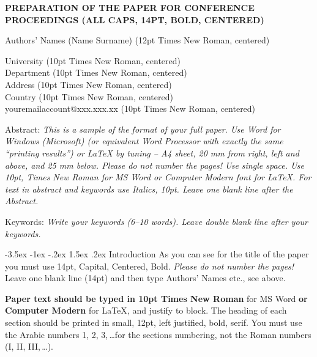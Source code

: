 \documentclass[a4paper,10pt]{article}
\makeatletter
\theoremstyle{definition}
\renewcommand\section{\@startsection {section}{1}{\z@}%
                                   {-3.5ex \@plus -1ex \@minus -.2ex}%
                                   {1.5ex \@plus.2ex}%
                                   {\large\bfseries}}
\makeatother
\begin{document}
\pagestyle{empty}

\begin{center}
{\bf \Large PREPARATION OF THE PAPER FOR CONFERENCE\\
\medskip PROCEEDINGS (ALL CAPS, 14PT, BOLD, CENTERED)}
\end{center}

\smallskip
\begin{center}
{\large Authors' Names (Name Surname) (12pt Times New Roman, centered)}
\end{center}

\smallskip
\begin{center}
University (10pt Times New Roman, centered)\\
Department (10pt Times New Roman, centered)\\
Address (10pt Times New Roman, centered)\\
Country (10pt Times New Roman, centered)\\
youremailaccount@xxx.xxx.xx (10pt Times New Roman, centered)
\end{center}

\bigskip
\noindent Abstract: \textit{This is a sample of the format of your
full paper. Use Word for Windows (Microsoft) (or equivalent Word
Processor with exactly the same ``printing results'') or \LaTeX{} by
tuning -- A4 sheet, 20 mm from right, left and above, and 25 mm
below. Please do not number the pages! Use single space. Use 10pt, Times New
Roman for MS Word or Computer Modern font for \LaTeX{}. For text in abstract and keywords use Italics, 10pt. Leave one blank line after the Abstract.}

\vspace*{10pt} \noindent Keywords: \textit{Write your keywords (6--10 words).
Leave double blank line after your keywords.}

\bigskip
\section{Introduction}
\label{sec:1}
As you can see for the title of the paper you must use 14pt,
Capital, Centered, Bold. \textit{Please do not
number the pages!} Leave one blank line (14pt) and then type
Authors' Names etc., see above.

\textbf{Paper text should be typed in 10pt Times New Roman} for MS Word \textbf{or Computer Modern} for \LaTeX{}, and justify to
block. The heading of each section should be printed in small,
12pt, left justified, bold, serif. You must use the Arabic numbers
1, 2, 3,\,\dots for the sections numbering, not the Roman
numbers (I, II, III,\,\dots).
\end{document}
